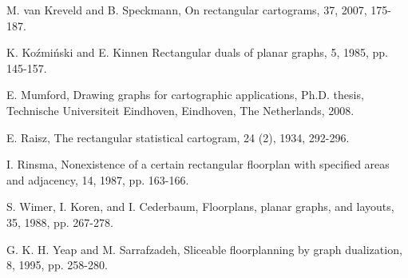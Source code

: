\documentclass[11pt]{article}
\begin{document}
\begin{thebibliography}{5}
M. van Kreveld and B. Speckmann,
\newblock On rectangular cartograms,
 37, 2007, 175-187.

K. Ko\'{z}mi\'{n}ski and E. Kinnen
\newblock Rectangular duals of planar graphs,
 5, 1985, pp. 145-157.

E. Mumford,
\newblock Drawing graphs for cartographic applications,
Ph.D. thesis, Technische Universiteit
Eindhoven, Eindhoven, The Netherlands, 2008.

E. Raisz,
\newblock The rectangular statistical cartogram,
 24 (2), 1934, 292-296.

I. Rinsma,
\newblock Nonexistence of a certain rectangular floorplan with
specified areas and adjacency,
 14, 1987, pp. 163-166.

S. Wimer, I. Koren, and I. Cederbaum,
\newblock Floorplans, planar graphs, and layouts,
 35, 1988, pp. 267-278.

G. K. H. Yeap and M. Sarrafzadeh,
\newblock Sliceable floorplanning by graph dualization,
 8, 1995, pp. 258-280.

\end{thebibliography}
\end{document}
